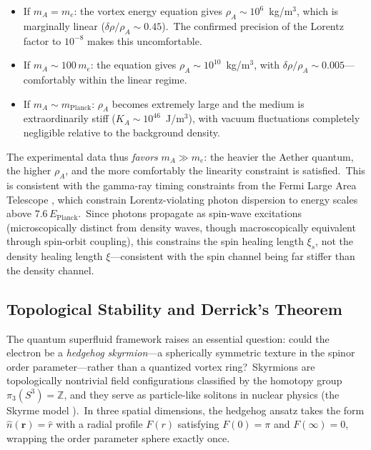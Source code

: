 ﻿\documentclass[12pt,letterpaper]{article}
\newcommand{\rhoa}{\rho_{\!A}}
\newcommand{\Ka}{K_{\!A}}
\begin{document}
\begin{itemize}[leftmargin=2em]
  \item If $m_A = m_e$: the vortex energy equation gives $\rhoa \sim 10^6$~kg/m$^3$,
    which is marginally linear ($\delta\rho/\rhoa \sim 0.45$).\ The confirmed
    precision of the Lorentz factor to $10^{-8}$ makes this uncomfortable.

  \item If $m_A \sim 100\,m_e$: the equation gives $\rhoa \sim 10^{10}$~kg/m$^3$,
    with $\delta\rho/\rhoa \sim 0.005$---comfortably within the linear regime.

  \item If $m_A \sim m_{\mathrm{Planck}}$: $\rhoa$ becomes extremely large and the
    medium is extraordinarily stiff ($\Ka \sim 10^{46}$~J/m$^3$), with vacuum
    fluctuations completely negligible relative to the background density.
\end{itemize}

The experimental data thus \emph{favors} $m_A \gg m_e$: the heavier the Aether
quantum, the higher $\rhoa$, and the more comfortably the linearity constraint
is satisfied.\ This is consistent with the gamma-ray timing constraints from the
Fermi Large Area Telescope \cite{vasileiou2013}, which constrain Lorentz-violating
photon dispersion to energy scales above $7.6\,E_{\mathrm{Planck}}$.\ Since
photons propagate as spin-wave excitations (microscopically distinct from
density waves, though macroscopically equivalent through spin-orbit
coupling), this constrains the spin healing length $\xi_s$, not the
density healing length $\xi$---consistent
with the spin channel being far stiffer than the density channel.



\subsection{Topological Stability and Derrick's Theorem}
\label{sec:derrick}

The quantum superfluid framework raises an essential question: could the electron be
a \emph{hedgehog skyrmion}---a spherically symmetric texture in the spinor order
parameter---rather than a quantized vortex ring?\ Skyrmions are topologically
nontrivial field configurations classified by the homotopy group $\pi_3(S^3) = \mathbb{Z}$,
and they serve as particle-like solitons in nuclear physics (the Skyrme model
\cite{skyrme1962}).\ In three spatial dimensions, the hedgehog ansatz takes the form
$\hat{n}(\mathbf{r}) = \hat{r}$ with a radial profile $F(r)$ satisfying $F(0) = \pi$
and $F(\infty) = 0$, wrapping the order parameter sphere exactly once.
\end{document}
